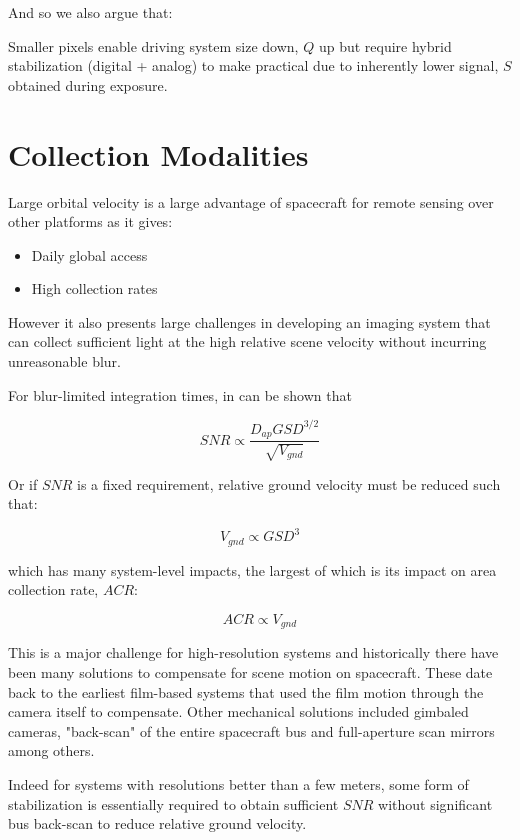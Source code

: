 \documentclass[10pt,journal]{IEEEtran}  %
\begin{document}
And so we also argue that:
\begin{observation}
Smaller pixels enable driving system size down, $Q$ up but require hybrid stabilization (digital + analog) to make practical due to inherently lower signal, $S$ obtained during exposure.
\end{observation}

\section{Collection Modalities}
\label{sec:modalities}
Large orbital velocity is a large advantage of spacecraft for remote sensing over other platforms as it gives:


\begin{itemize}
\item Daily global access
\item High collection rates
\end{itemize}

However it also presents large challenges in developing an imaging system that can collect sufficient light at the high relative scene velocity without incurring unreasonable blur.

For blur-limited integration times, in can be shown that \cite{shaw}

$$SNR \propto \frac{D_{ap} GSD^{3/2}}{\sqrt{V_{gnd}}}$$

Or if $SNR$ is a fixed requirement, relative ground velocity must be reduced such that:

\begin{equation}
V_{gnd} \propto GSD^3
\end{equation}

which has many system-level impacts, the largest of which is its impact on area collection rate, $ACR$:

$$ACR \propto V_{gnd}$$

This is a major challenge for high-resolution systems and historically there have been many solutions to compensate for scene motion on spacecraft.  These date back to the earliest film-based systems that used the film motion through the camera itself to compensate.  Other mechanical solutions included gimbaled cameras, "back-scan" of the entire spacecraft bus and full-aperture scan mirrors among others.

Indeed for systems with resolutions better than a few meters, some form of stabilization is essentially required to obtain sufficient $SNR$ without significant bus back-scan to reduce relative ground velocity.
\end{document}
